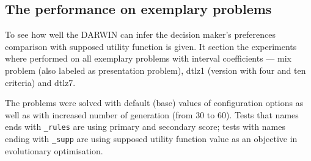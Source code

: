 \subsection{The performance on exemplary problems}
To see how well the DARWIN can infer the decision maker's preferences
comparison with supposed utility function is given. It section the experiments
where performed on all exemplary problems with interval coefficients --- mix
problem (also labeled as presentation problem), dtlz1 (version with four and
ten criteria) and dtlz7.

The problems were solved with default (base) values of configuration options
as well as with increased number of generation (from $30$ to $60$). Tests that
names ends with \texttt{\_rules} are using primary and secondary score; tests
with names ending with \texttt{\_supp} are using supposed utility function
value as an objective in evolutionary optimisation.

